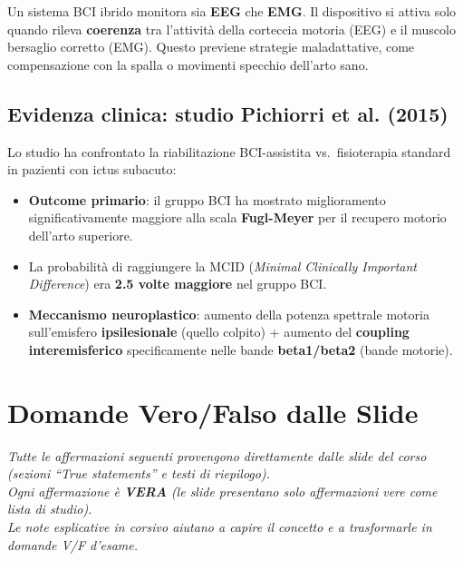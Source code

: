 \begin{definizione}
Un sistema BCI ibrido monitora sia \textbf{EEG} che \textbf{EMG}. Il dispositivo si attiva solo quando rileva \textbf{coerenza} tra l'attività della corteccia motoria (EEG) e il muscolo bersaglio corretto (EMG). Questo previene strategie maladattative, come compensazione con la spalla o movimenti specchio dell'arto sano.
\end{definizione}

\section{Evidenza clinica: studio Pichiorri et al. (2015)}

Lo studio ha confrontato la riabilitazione BCI-assistita vs.\ fisioterapia standard in pazienti con ictus subacuto:
\begin{itemize}
    \item \textbf{Outcome primario}: il gruppo BCI ha mostrato miglioramento significativamente maggiore alla scala \textbf{Fugl-Meyer} per il recupero motorio dell'arto superiore.
    \item La probabilità di raggiungere la MCID (\textit{Minimal Clinically Important Difference}) era \textbf{2.5 volte maggiore} nel gruppo BCI.
    \item \textbf{Meccanismo neuroplastico}: aumento della potenza spettrale motoria sull'emisfero \textbf{ipsilesionale} (quello colpito) + aumento del \textbf{coupling interemisferico} specificamente nelle bande \textbf{beta1/beta2} (bande motorie).
\end{itemize}

\chapter{Domande Vero/Falso dalle Slide}

\begin{center}
\textit{Tutte le affermazioni seguenti provengono direttamente dalle slide del corso (sezioni ``True statements'' e testi di riepilogo). \\[4pt]
Ogni affermazione è \textbf{VERA} (le slide presentano solo affermazioni vere come lista di studio). \\[4pt]
Le note esplicative in corsivo aiutano a capire il concetto e a trasformarle in domande V/F d'esame.}
\end{center}

